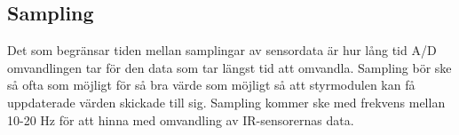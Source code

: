 \documentclass[11pt]{article}
\begin{document}
\begin{flushleft}
\subsection{Sampling}
Det som begränsar tiden mellan samplingar av sensordata är hur lång tid A/D omvandlingen tar för den data som tar längst tid att omvandla. Sampling bör ske så ofta som möjligt för så bra värde som möjligt så att styrmodulen kan få uppdaterade värden skickade till sig. Sampling kommer ske med frekvens mellan 10-20 Hz för att hinna med omvandling av IR-sensorernas data. 

\pagebreak
{}



\end{flushleft}
\end{document}
